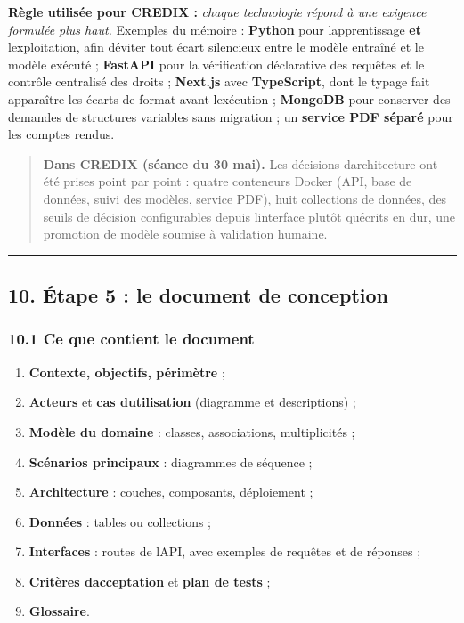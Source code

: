 \documentclass[
  french,
  11pt,
  a4paper,
]{article}
\providecommand{\tightlist}{%
  \setlength{\itemsep}{0pt}\setlength{\parskip}{0pt}}
\begin{document}
\textbf{Règle utilisée pour CREDIX :} \emph{chaque technologie répond à
une exigence formulée plus haut.} Exemples du mémoire : \textbf{Python}
pour l\textquotesingle apprentissage \textbf{et}
l\textquotesingle exploitation, afin d\textquotesingle éviter tout écart
silencieux entre le modèle entraîné et le modèle exécuté ;
\textbf{FastAPI} pour la vérification déclarative des requêtes et le
contrôle centralisé des droits ; \textbf{Next.js} avec
\textbf{TypeScript}, dont le typage fait apparaître les écarts de format
avant l\textquotesingle exécution ; \textbf{MongoDB} pour conserver des
demandes de structures variables sans migration ; un \textbf{service PDF
séparé} pour les comptes rendus.

\begin{quote}
\textbf{Dans CREDIX (séance du 30 mai).} Les décisions
d\textquotesingle architecture ont été prises point par point : quatre
conteneurs Docker (API, base de données, suivi des modèles, service
PDF), huit collections de données, des seuils de décision configurables
depuis l\textquotesingle interface plutôt qu\textquotesingle écrits en
dur, une promotion de modèle soumise à validation humaine.
\end{quote}

\begin{center}\rule{0.5\linewidth}{0.5pt}\end{center}

\subsection{10. Étape 5 : le document de
conception}\label{10-uxe9tape-5--le-document-de-conception}

\subsubsection{10.1 Ce que contient le
document}\label{101-ce-que-contient-le-document}

\begin{enumerate}
\def\labelenumi{\arabic{enumi}.}
\tightlist
\item
  \textbf{Contexte, objectifs, périmètre} ;
\item
  \textbf{Acteurs} et \textbf{cas d\textquotesingle utilisation}
  (diagramme et descriptions) ;
\item
  \textbf{Modèle du domaine} : classes, associations, multiplicités ;
\item
  \textbf{Scénarios principaux} : diagrammes de séquence ;
\item
  \textbf{Architecture} : couches, composants, déploiement ;
\item
  \textbf{Données} : tables ou collections ;
\item
  \textbf{Interfaces} : routes de l\textquotesingle API, avec exemples
  de requêtes et de réponses ;
\item
  \textbf{Critères d\textquotesingle acceptation} et \textbf{plan de
  tests} ;
\item
  \textbf{Glossaire}.
\end{enumerate}
\end{document}
